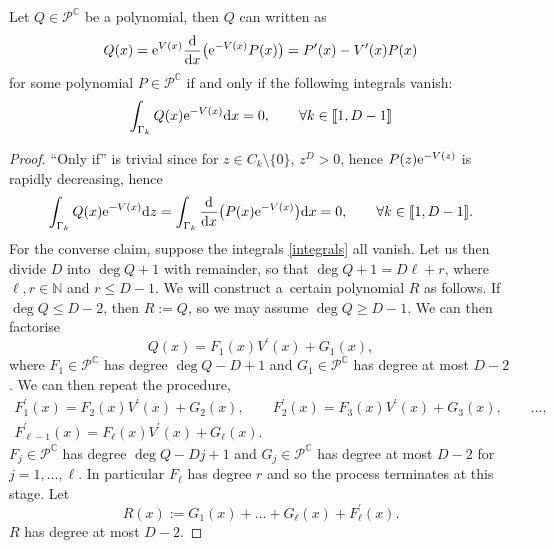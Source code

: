 \begin{Proposition}\label{representation} Let $Q \in \mathscr{P}^\mathbb{C}$ be a polynomial, then $Q$ can written as
\begin{equation*}
Q(x) = {\rm e}^{V(x)} \frac{\rm d}{{\rm d}x}\big({\rm e}^{-V(x)} P(x) \big) = P^\prime(x) - V^\prime(x) P(x)
\end{equation*}
for some polynomial $P \in \mathscr{P}^\mathbb{C}$ if and only if the following integrals vanish:
\begin{align}\label{integrals}
\int_{\Gamma_k} Q(x){\rm e}^{-V(x)} {\rm d}x = 0,\qquad \forall k \in [\![ 1,D-1]\!]
\end{align}
\end{Proposition}
\begin{proof}
\enquote{Only if} is trivial since for $z \in C_k \setminus \{ 0 \}$, $z^{D} > 0$, hence $P(z){\rm e}^{-V(z)}$ is rapidly decreasing, hence
\begin{align*}
\int_{\Gamma_k} Q(x){\rm e}^{-V(x)} {\rm d}z = \int_{\Gamma_k} \frac{\rm d}{{\rm d}x}\big(P(x){\rm e}^{-V(x)}\big) {\rm d}x =0,\qquad \forall k \in [\![ 1,D-1]\!].
\end{align*}
For the converse claim, suppose the integrals \eqref{integrals} all vanish. Let us then divide $D$ into ${\deg Q+1}$ with remainder, so that $\deg Q+1 = D \ell + r$, where $\ell , r \in \mathbb{N}$ and $r \leq D-1$. We will construct a~certain polynomial $R$ as follows. If $\deg Q \leq D-2$, then $R:=Q$, so we may assume ${\deg Q \geq D-1}$. We can then factorise
\begin{equation*}
Q(x) = F_1 (x) V^\prime(x) + G_1(x),
\end{equation*}
where $F_1 \in \mathscr{P}^\mathbb{C}$ has degree $\deg Q - D+1$ and $G_1 \in \mathscr{P}^\mathbb{C}$ has degree at most $D-2$. We can then repeat the procedure,
\begin{gather*}
F_1^\prime(x) = F_2(x) V^\prime(x) + G_2(x), \qquad
F_2^\prime(x)= F_3(x) V^\prime(x) + G_3(x),\qquad \ldots, \\
F_{\ell-1}^\prime(x) = F_{\ell}(x) V^\prime(x) + G_{\ell}(x).
\end{gather*}
$F_j \in \mathscr{P}^\mathbb{C}$ has degree $\deg Q-Dj+1$ and $G_j \in \mathscr{P}^\mathbb{C}$ has degree at most $D-2$ for $j=1, \dots , \ell$. In particular $F_\ell$ has degree $r$ and so the process terminates at this stage. Let
\begin{equation*}
R(x) := G_1(x) + \dots + G_\ell(x) + F_\ell^\prime(x).
\end{equation*}
$R$ has degree at most $D-2$.


\end{proof}
